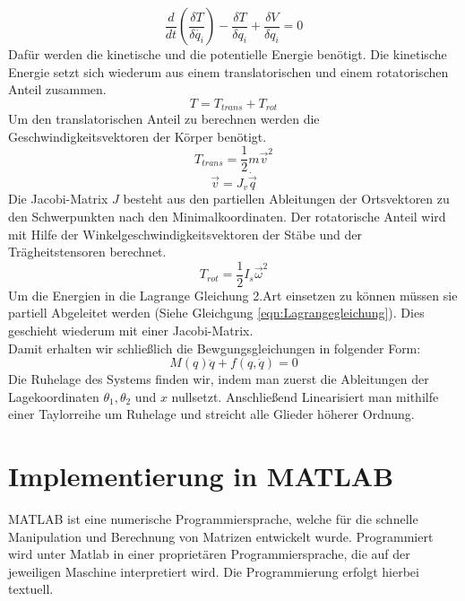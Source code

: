 \documentclass[a4paper, 10pt]{report}
\begin{document}
\begin{equation}
\label{eqn:Lagrangegleichung}
\dfrac{d}{dt}(\dfrac{\delta T}{\delta \dot{q_{i}}})-\dfrac{\delta T}{\delta q_{i}}+\dfrac{\delta V}{\delta q_{i}}=0
\end{equation}
Dafür werden die kinetische und die potentielle Energie benötigt. Die kinetische Energie setzt sich wiederum aus einem translatorischen und einem rotatorischen Anteil zusammen.
\begin{equation}
T=T_{trans}+T_{rot} 
\end{equation}
Um den translatorischen Anteil zu berechnen werden die Geschwindigkeitsvektoren der Körper benötigt.
\begin{equation}
T_{trans}=\dfrac{1}{2} m \vec{v}^{2} 
\end{equation}
\begin{equation}
\vec{v}=J_{v}\dot{\vec{q}}
\end{equation}
Die Jacobi-Matrix $J$ besteht aus den partiellen Ableitungen der Ortsvektoren zu den Schwerpunkten nach den Minimalkoordinaten.
Der rotatorische Anteil wird mit Hilfe der Winkelgeschwindigkeitsvektoren der Stäbe und der Trägheitstensoren berechnet.
\begin{equation}
T_{rot}=\dfrac{1}{2} I_{s} \vec{\omega}^{2}
\end{equation}
Um die Energien in die Lagrange Gleichung 2.Art einsetzen zu können müssen sie partiell Abgeleitet werden (Siehe Gleichgung \ref{eqn:Lagrangegleichung}). Dies geschieht wiederum mit einer Jacobi-Matrix. \\
Damit erhalten wir schließlich die Bewgungsgleichungen in folgender Form:
\begin{equation}
M(q)\ddot{q} + f(q,\dot{q}) = 0
\end{equation}
Die Ruhelage des Systems finden wir, indem man zuerst die Ableitungen der Lagekoordinaten $\theta_{1}, \theta_{2}$ und $x$ nullsetzt. Anschließend Linearisiert man mithilfe einer Taylorreihe um Ruhelage und streicht alle Glieder höherer Ordnung.
\chapter{Implementierung in MATLAB}
%
%
MATLAB ist eine numerische Programmiersprache, welche für die schnelle Manipulation und Berechnung von Matrizen entwickelt wurde. Programmiert wird unter Matlab in einer proprietären Programmiersprache, die auf der jeweiligen Maschine interpretiert wird. Die Programmierung erfolgt hierbei textuell.
\end{document}
